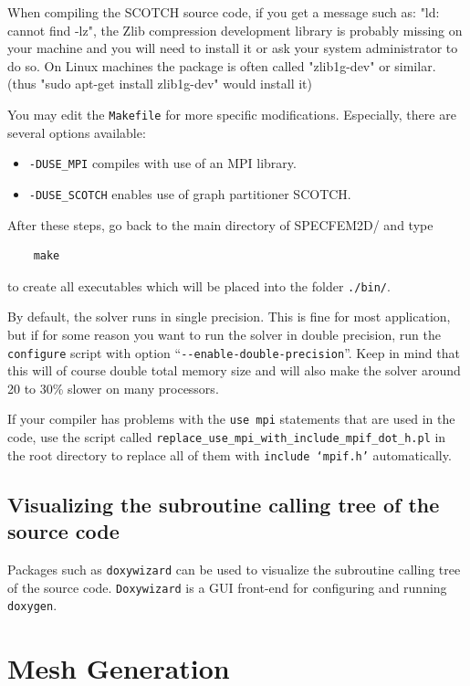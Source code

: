 \documentclass[oneside,english,onecolumn,letterpaper]{book}
\begin{document}
When compiling the SCOTCH source code, if you get a message such as: "ld: cannot find -lz", 
the Zlib compression development library is probably missing on your machine and you will need to install it or ask your system administrator to 
do so. On Linux machines the package is often called "zlib1g-dev" or similar. (thus "sudo apt-get install zlib1g-dev" would install it)

You may edit the \texttt{Makefile} for more specific modifications. Especially, there are several options available:
%
\begin{itemize}
\item \texttt{-DUSE\_MPI} compiles with use of an MPI library.
\item \texttt{-DUSE\_SCOTCH} enables use of graph partitioner SCOTCH.
\end{itemize}
%
After these steps, go back to the main directory of SPECFEM2D/ and type
%
\begin{verbatim}
    make
\end{verbatim}
%
to create all executables which will be placed into the folder \texttt{./bin/}.

By default, the solver runs in single precision. This is fine for most application, but if for some reason
you want to run the solver in double precision, run the \texttt{configure} script with option ``\texttt{-{}-enable-double-precision}''.
Keep in mind that this will of course double total memory size and will also make the solver around 20 to 30\% slower
on many processors.

If your compiler has problems with the \texttt{use mpi} statements that are used in the code, use the script called
\texttt{replace\_use\_mpi\_with\_include\_mpif\_dot\_h.pl} in the root directory to replace all of them with \texttt{include `mpif.h'} automatically.

\section{Visualizing the subroutine calling tree of the source code}

Packages such as \texttt{doxywizard} can be used to visualize the subroutine calling tree of the source code.
\texttt{Doxywizard} is a GUI front-end for configuring and running \texttt{doxygen}.


\chapter{Mesh Generation}
\end{document}
